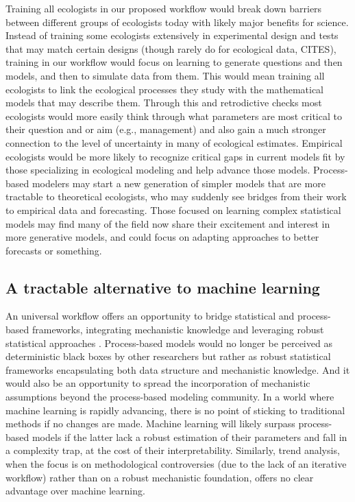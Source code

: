 \documentclass[11pt]{article}
\begin{document}
Training all ecologists in our proposed workflow would break down barriers between different groups of ecologists today with likely major benefits for science. Instead of training some ecologists extensively in experimental design and tests that may match certain designs (though rarely do for ecological data, CITES), training in our workflow would focus on learning to generate questions and then models, and then to simulate data from them. This would mean training all ecologists to link the ecological processes they study with the mathematical models that may describe them. Through this and retrodictive checks most ecologists would more easily think through what parameters are most critical to their question and or aim (e.g., management) and also gain a much stronger connection to the level of uncertainty in many of ecological estimates. Empirical ecologists would be more likely to recognize critical gaps in current models fit by those specializing in ecological modeling and help advance those models. Process-based modelers may start a new generation of simpler models that are more tractable to theoretical ecologists, who may suddenly see bridges from their work to empirical data and forecasting. 
Those focused on learning complex statistical models may find many of the field now share their excitement and interest in more generative models, and could focus on adapting approaches to better forecasts or something.

\subsection{A tractable alternative to machine learning}

An universal workflow offers an opportunity to bridge statistical and process-based frameworks, integrating mechanistic knowledge and leveraging robust statistical approaches \citep[e.g.][]{rounce2020quantifying}. Process-based models would no longer be perceived as deterministic black boxes by other researchers but rather as robust statistical frameworks encapsulating both data structure and mechanistic knowledge. And it would also be an opportunity to spread the incorporation of mechanistic assumptions beyond the process-based modeling community.
In a world where machine learning is rapidly advancing, there is no point of sticking to traditional methods if no changes are made. Machine learning will likely surpass process-based models if the latter lack a robust estimation of their parameters and fall in a complexity trap, at the cost of their interpretability. Similarly, trend analysis, when the focus is on methodological controversies (due to the lack of an iterative workflow) rather than on a robust mechanistic foundation, offers no clear advantage over machine learning.
\end{document}
